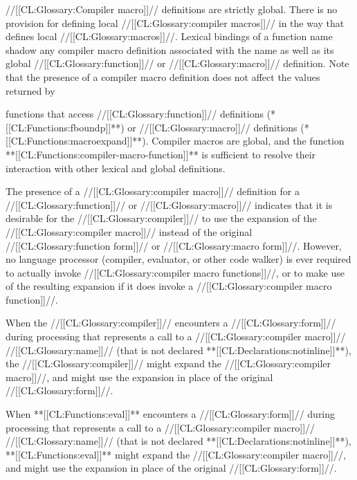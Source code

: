 //[[CL:Glossary:Compiler macro]]// definitions are strictly global.  There is no provision for defining local //[[CL:Glossary:compiler macros]]// in the way that  defines local //[[CL:Glossary:macros]]//.  Lexical bindings of a function name shadow any compiler macro definition associated with the name as well as its  global //[[CL:Glossary:function]]// or //[[CL:Glossary:macro]]// definition.
  Note that the presence of a compiler macro definition does not affect the values returned by 

functions that access //[[CL:Glossary:function]]// definitions (\eg **[[CL:Functions:fboundp]]**) or //[[CL:Glossary:macro]]// definitions (\eg **[[CL:Functions:macroexpand]]**). Compiler macros are global, and the function **[[CL:Functions:compiler-macro-function]]** is sufficient to resolve their interaction with other lexical and global definitions.

\endsubsubsubsection%


The presence of a //[[CL:Glossary:compiler macro]]// definition for a //[[CL:Glossary:function]]// or //[[CL:Glossary:macro]]// indicates that it is desirable for the //[[CL:Glossary:compiler]]// to use the expansion of the //[[CL:Glossary:compiler macro]]// instead of the original //[[CL:Glossary:function form]]// or //[[CL:Glossary:macro form]]//.  However, no language processor (compiler, evaluator, or other code walker) is ever required to actually invoke //[[CL:Glossary:compiler macro functions]]//, or to  make use of the resulting expansion if it does invoke  a //[[CL:Glossary:compiler macro function]]//.

When the //[[CL:Glossary:compiler]]// encounters a //[[CL:Glossary:form]]// during processing that represents a call to a //[[CL:Glossary:compiler macro]]// //[[CL:Glossary:name]]// (that is not declared **[[CL:Declarations:notinline]]**), the //[[CL:Glossary:compiler]]// might expand the //[[CL:Glossary:compiler macro]]//,  and might use the expansion in place of the original //[[CL:Glossary:form]]//.

When **[[CL:Functions:eval]]** encounters a //[[CL:Glossary:form]]// during processing that represents  a call to a //[[CL:Glossary:compiler macro]]// //[[CL:Glossary:name]]// (that is not declared **[[CL:Declarations:notinline]]**), **[[CL:Functions:eval]]** might expand the //[[CL:Glossary:compiler macro]]//, and might use the expansion in place of the original //[[CL:Glossary:form]]//.

